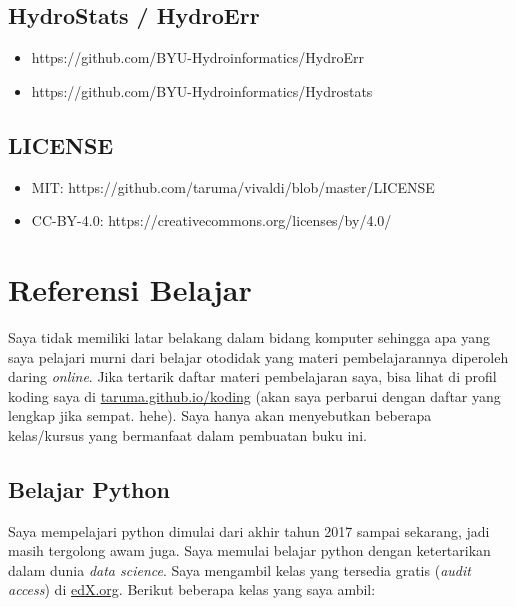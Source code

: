\documentclass[11pt]{article}
\providecommand{\tightlist}{%
      \setlength{\itemsep}{0pt}\setlength{\parskip}{0pt}}
\begin{document}
\hypertarget{hydrostats-hydroerr}{%
\subsection{HydroStats / HydroErr}\label{hydrostats-hydroerr}}

\begin{itemize}
\tightlist
\item
  https://github.com/BYU-Hydroinformatics/HydroErr
\item
  https://github.com/BYU-Hydroinformatics/Hydrostats
\end{itemize}

\hypertarget{license}{%
\subsection{LICENSE}\label{license}}

\begin{itemize}
\tightlist
\item
  MIT: https://github.com/taruma/vivaldi/blob/master/LICENSE
\item
  CC-BY-4.0: https://creativecommons.org/licenses/by/4.0/
\end{itemize}

    \hypertarget{referensi-belajar}{%
\section{Referensi Belajar}\label{referensi-belajar}}

Saya tidak memiliki latar belakang dalam bidang komputer sehingga apa
yang saya pelajari murni dari belajar otodidak yang materi
pembelajarannya diperoleh daring \emph{online}. Jika tertarik daftar
materi pembelajaran saya, bisa lihat di profil koding saya di
\href{https://taruma.github.io/koding}{taruma.github.io/koding} (akan
saya perbarui dengan daftar yang lengkap jika sempat. hehe). Saya hanya
akan menyebutkan beberapa kelas/kursus yang bermanfaat dalam pembuatan
buku ini.

    \hypertarget{belajar-python}{%
\subsection{Belajar Python}\label{belajar-python}}

Saya mempelajari python dimulai dari akhir tahun 2017 sampai sekarang,
jadi masih tergolong awam juga. Saya memulai belajar python dengan
ketertarikan dalam dunia \emph{data science}. Saya mengambil kelas yang
tersedia gratis (\emph{audit access}) di
\href{https://www.edx.org/}{edX.org}. Berikut beberapa kelas yang saya
ambil:
\end{document}
